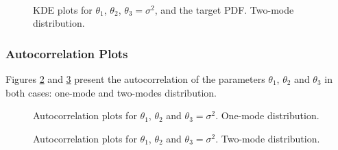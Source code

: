 \begin{figure}[hptb]
\centering
{}
\\
\vspace{-10pt}
\caption{KDE plots for $\theta_1$, $\theta_2$, $\theta_3=\sigma^2$, and the target PDF. Two-mode distribution.}
\label{fig:modal_kde_2modes}
\end{figure}


\subsubsection{Autocorrelation Plots}

Figures \ref{fig:modal_autocorr_1mode} and \ref{fig:modal_autocorr_2modes} present the autocorrelation of the parameters $\theta_1$, $\theta_2$ and $\theta_3$ in both cases: one-mode and two-modes distribution.

\begin{figure}[htpb]
\centering
{}
\vspace{-10pt}
\caption{Autocorrelation plots for $\theta_1$, $\theta_2$ and $\theta_3=\sigma^2$. One-mode distribution.}
\label{fig:modal_autocorr_1mode}
\end{figure}

\begin{figure}[htpb]
\centering
{}
\vspace{-10pt}
\caption{Autocorrelation plots for $\theta_1$, $\theta_2$ and $\theta_3=\sigma^2$. Two-mode distribution.}
\label{fig:modal_autocorr_2modes}
\end{figure}